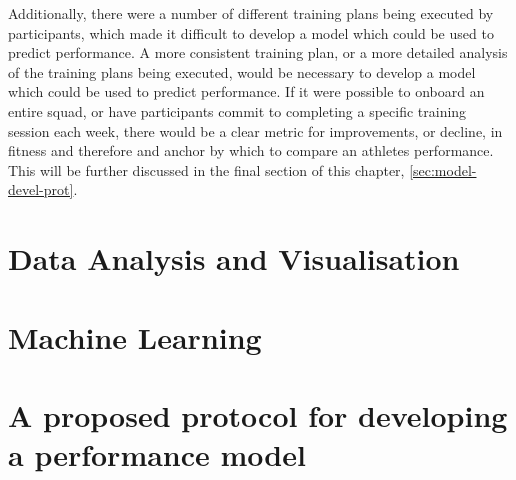Additionally, there were a number of different training plans being executed by participants, which made it difficult to develop a model which could be used to predict performance. A more consistent training plan, or a more detailed analysis of the training plans being executed, would be necessary to develop a model which could be used to predict performance. If it were possible to onboard an entire squad, or have participants commit to completing a specific training session each week, there would be a clear metric for improvements, or decline, in fitness and therefore and anchor by which to compare an athletes performance. This will be further discussed in the final section of this chapter, \autoref{sec:model-devel-prot}.

\section{Data Analysis and Visualisation}
\section{Machine Learning}
\section{\label{sec:model-devel-prot}A proposed protocol for developing a performance model}
